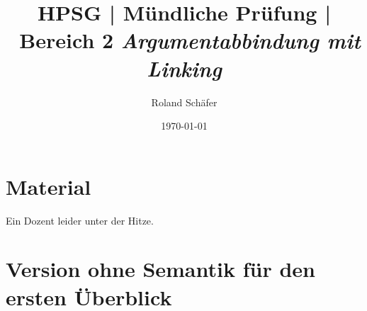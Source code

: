 \documentclass[10pt,a3paper]{article}
\author{Roland Schäfer}
\title{HPSG | Mündliche Prüfung | Bereich 2 \textit{Argumentabbindung mit Linking}}
\date{\today}
\begin{document}
\maketitle

\thispagestyle{empty}

\section{Material}

\begin{exe}
  \ex Ein Dozent leider unter der Hitze.\label{ex:satz}
\end{exe}

\section{Version ohne Semantik für den ersten Überblick}
\end{document}
